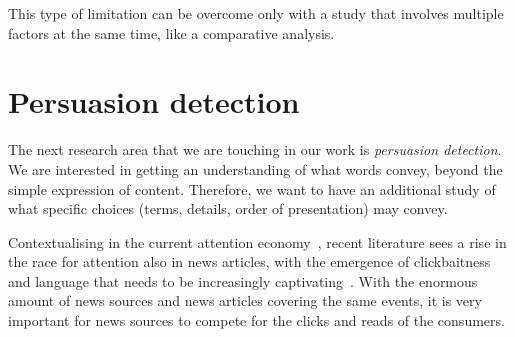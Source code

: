 This type of limitation can be overcome only with a study that involves multiple factors at the same time, like a comparative analysis.

\section{\statusgreen Persuasion detection}
\label{sec:lit_persuasion}

The next research area that we are touching in our work is \emph{persuasion detection}.
We are interested in getting an understanding of what words convey, beyond the simple expression of content.
Therefore, we want to have an additional study of what specific choices (terms, details, order of presentation) may convey.



Contextualising in the current attention economy~\citep{davenport2001attention}, recent literature sees a rise in the race for attention also in news articles, with the emergence of clickbaitness and language that needs to be increasingly captivating~\citep{bazaco2019clickbait,davenport2001attention}.
With the enormous amount of news sources and news articles covering the same events, it is very important for news sources to compete for the clicks and reads of the consumers.

